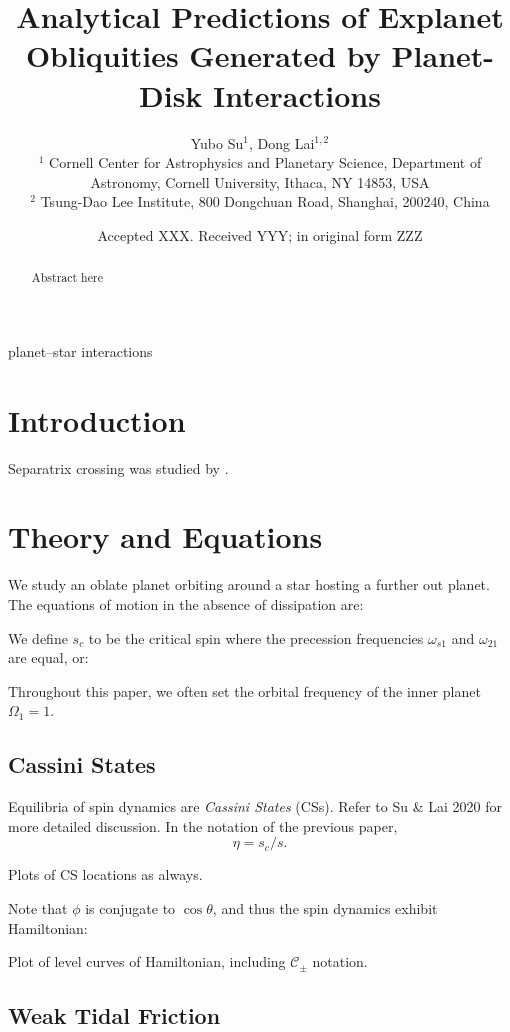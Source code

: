 \documentclass[
        fleqn,
        usenatbib,
        referee,
    ]{mnras}
\title[Analytical Exoplanet Obliquities]{Analytical Predictions of Explanet
Obliquities Generated by Planet-Disk Interactions}
\author[Y. Su and D. Lai]{
Yubo Su$^1$,
Dong Lai$^{1,2}$
\\
$^1$ Cornell Center for Astrophysics and Planetary Science, Department of
Astronomy, Cornell University, Ithaca, NY 14853, USA
\\
$^2$ Tsung-Dao Lee Institute, 800 Dongchuan Road, Shanghai, 200240, China
}
\date{Accepted XXX\@. Received YYY\@; in original form ZZZ}
\begin{document}
\label{firstpage}
\pagerange{\pageref{firstpage}--\pageref{lastpage}}
\maketitle

\begin{abstract}
    Abstract here
\end{abstract}

\begin{keywords}
planet--star interactions %
\end{keywords}

\section{Introduction}

Separatrix crossing was studied by \citep{henrard1982}.

\section{Theory and Equations}\label{s:theory}

We study an oblate planet orbiting around a star hosting a further out planet.
The equations of motion in the absence of dissipation are:

We define $s_c$ to be the critical spin where the precession frequencies
$\omega_{s1}$ and $\omega_{21}$ are equal, or:

Throughout this paper, we often set the orbital frequency of the inner planet
$\Omega_1 = 1$.

\subsection{Cassini States}\label{ss:cs_theory}

Equilibria of spin dynamics are \emph{Cassini States} (CSs). Refer to Su \& Lai
2020 for more detailed discussion. In the notation of the previous paper,
\begin{equation}
    \eta = s_c / s.
\end{equation}

Plots of CS locations as always.

Note that $\phi$ is conjugate to $\cos \theta$, and thus the spin dynamics
exhibit Hamiltonian:

Plot of level curves of Hamiltonian, including $\mathcal{C}_{\pm}$ notation.

\subsection{Weak Tidal Friction}\label{ss:weak_tides}
\end{document}
